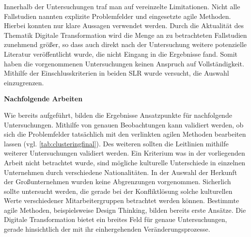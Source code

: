 Innerhalb der Untersuchungen traf man auf vereinzelte Limitationen. Nicht alle Fallstudien nannten explizite Problemfelder und eingesetzte agile Methoden. Hierbei konnten nur klare Aussagen verwendet werden. Durch die Aktualität des Thematik Digitale Transformation wird die Menge an zu betrachteten Fallstudien zunehmend größer, so dass auch direkt nach der Untersuchung weitere potenzielle Literatur veröffentlicht wurde, die nicht Eingang in die Ergebnisse fand. Somit haben die vorgenommenen Untersuchungen keinen Anspruch auf Vollständigkeit. Mithilfe der Einschlusskriterien in beiden SLR wurde versucht,  die Auswahl einzugrenzen.

\textbf{Nachfolgende Arbeiten} 

Wie bereits aufgeführt, bilden die Ergebnisse Ansatzpunkte für nachfolgende Untersuchungen. Mithilfe von genauen Beobachtungen kann validiert werden, ob sich die Problemfelder tatsächlich mit den verlinkten agilen Methoden bearbeiten lassen (vgl. \ref{tab:clusteringfinal}). Des weiteren sollten die Leitlinien mithilfe weiterer Untersuchungen validiert werden. Ein Kriterium was in der vorliegenden Arbeit nicht betrachtet wurde, sind mögliche kulturelle Unterschiede in einzelnen Unternehmen durch verschiedene Nationalitäten. In der Auswahl der Herkunft der Großunternehmen wurden keine Abgrenzungen vorgenommen. Sicherlich sollte untersucht werden, die gerade bei der Konfliktlösung solche kulturellen Werte verschiedener Mitarbeitergruppen betrachtet werden können. Bestimmte agile Methoden, beispielsweise Design Thinking, bilden bereits erste Ansätze. Die Digitale Transformation bietet ein breites Feld für genaue Untersuchungen, gerade hinsichtlich der mit ihr einhergehenden Veränderungsprozesse.